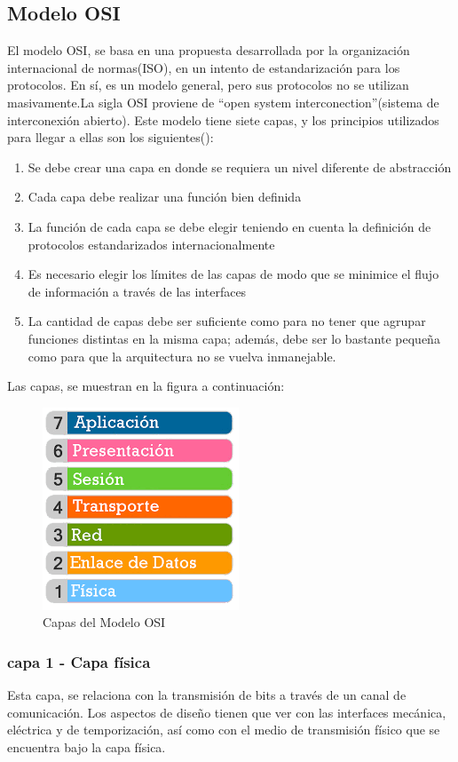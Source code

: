 \subsection{Modelo OSI}
El modelo OSI, se basa en una propuesta desarrollada por la organización internacional de normas(ISO), en un intento de estandarización para los protocolos. En sí, es un modelo general, pero sus protocolos no se utilizan masivamente.La sigla OSI proviene de ``open system interconection''(sistema de interconexión abierto). Este modelo tiene siete capas, y los principios utilizados para llegar a ellas son los siguientes(\cite{Tanenbaum2003}):
\begin{enumerate}
	\item Se debe crear una capa en donde se requiera un nivel diferente de abstracción 
	\item Cada capa debe realizar una función bien definida 
	\item La función de cada capa se debe elegir teniendo en cuenta la definición de protocolos estandarizados
	internacionalmente
	\item Es necesario elegir los límites de las capas de modo que se minimice el flujo de información a través de las interfaces 
	\item La cantidad de capas debe ser suficiente como para no tener que agrupar funciones distintas en
	la misma capa; además, debe ser lo bastante pequeña como para que la arquitectura no se vuelva
	inmanejable. 
\end{enumerate} 
Las capas, se muestran en la figura a continuación:%
\vspace{-2mm}  
\begin{figure}[ht]
	\centering
	\includegraphics[scale=0.5]{modelosi} 
	\caption{Capas del Modelo OSI}
	\label{fig:mod_osi}
\end{figure}  


\subsubsection{capa 1 - Capa física} 
Esta capa, se relaciona con la transmisión de bits a través de un canal de comunicación. Los aspectos de diseño tienen que ver con las interfaces mecánica, eléctrica y de temporización, así como con el medio de transmisión físico que se encuentra bajo la capa física.


